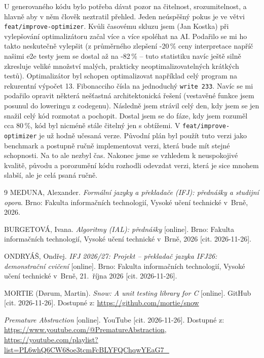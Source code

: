 \documentclass[11pt,a4paper]{article}
\begin{document}
U generovaného kódu bylo potřeba dávat pozor na čitelnost, srozumitelnost, a hlavně aby v něm člověk neztratil přehled. Jeden neúspěšný pokus je ve větvi \verb|feat/improve-optimizer|. Kvůli časovému skluzu jsem (Jan Kostka) při vylepšování optimalizátoru začal více a více spoléhat na AI. Podařilo se mi ho takto neskutečně vylepšit (z průměrného zlepšení -20\,\% ceny interpretace napříč našimi e2e testy jsem se dostal až na -82\,\% -- tuto statistiku navíc ještě silně zkresluje veliké množství malých, prakticky neoptimalizovatelných krátkých testů). Optimalizátor byl schopen optimalizovat například celý program na rekurentní výpočet 13. Fibonacciho čísla na jednoduchý \texttt{write 233}. Navíc se mi podařilo opravit některá nešťastná architektonická řešení (vestavěné funkce jsem posunul do loweringu z codegenu). Následně jsem strávil celý den, kdy jsem se jen snažil celý kód rozmotat a pochopit. Dostal jsem se do fáze, kdy jsem rozuměl cca 80\,\%, kód byl nicméně stále čitelný jen s obtížemi. V \verb|feat/improve-optimizer| je už hodně učesaná verze. Původní plán byl použít tuto verzi jako benchmark a postupně ručně implementovat verzi, která bude mít stejné schopnosti. Na to ale nezbyl čas. Nakonec jsme se vzhledem k neuspokojivé kvalitě, původu a porozumění kódu rozhodli odevzdat verzi, která je sice mnohem slabší, ale je celá psaná ručně.

\vfill
\begin{thebibliography}{9}
  MEDUNA, Alexander. \textit{Formální jazyky a překladače (IFJ): přednášky a studijní opora}. Brno: Fakulta informačních technologií, Vysoké učení technické v~Brně, 2026.

  BURGETOVÁ, Ivana. \textit{Algoritmy (IAL): přednášky} [online]. Brno: Fakulta informačních technologií, Vysoké učení technické v~Brně, 2026 [cit. 2026-11-26].

  ONDRYÁŠ, Ondřej. \textit{IFJ 2026/27: Projekt -- překladač jazyka IFJ26: demonstrační cvičení} [online]. Brno: Fakulta informačních technologií, Vysoké učení technické v~Brně, 21.~října 2026 [cit. 2026-11-26].

  MORTIE (Dørum, Martin). \textit{Snow: A unit testing library for C} [online]. GitHub [cit. 2026-11-26]. Dostupné z: \url{https://github.com/mortie/snow}

  \textit{Premature Abstraction} [online]. YouTube [cit. 2026-11-26]. Dostupné z:\\
  \url{https://www.youtube.com/@PrematureAbstraction},\\
  \url{https://youtube.com/playlist?list=PL6whQ6CW68oe3tcmFcBLYFQChqwYEaG7_}
\end{thebibliography}
\end{document}
